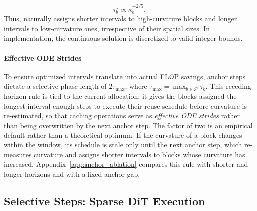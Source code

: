 \begin{equation}
    \tau_b^\star \propto \kappa_b^{-2/5}.
\end{equation}
Thus, \cubic naturally assigns shorter intervals to high-curvature blocks and longer intervals to low-curvature ones, irrespective of their spatial sizes. In implementation, the continuous solution is discretized to valid integer bounds. 

\paragraph{Effective ODE Strides}
To ensure optimized intervals translate into actual FLOP savings, anchor steps dictate a selective phase length of $2\tau_{\max}$, where $\tau_{\max} = \max_{b \in \mathcal{P}} \tau_b$. This receding-horizon rule is tied to the current allocation: it gives the blocks assigned the longest interval enough steps to execute their reuse schedule before curvature is re-estimated, so that caching operations serve as \emph{effective ODE strides} rather than being overwritten by the next anchor step. The factor of two is an empirical default rather than a theoretical optimum. If the curvature of a block changes within the window, its schedule is stale only until the next anchor step, which re-measures curvature and assigns shorter intervals to blocks whose curvature has increased. Appendix~\ref{app:anchor_ablation} compares this rule with shorter and longer horizons and with a fixed anchor gap.


\subsection{Selective Steps: Sparse DiT Execution}
\label{sec:selective_step}




